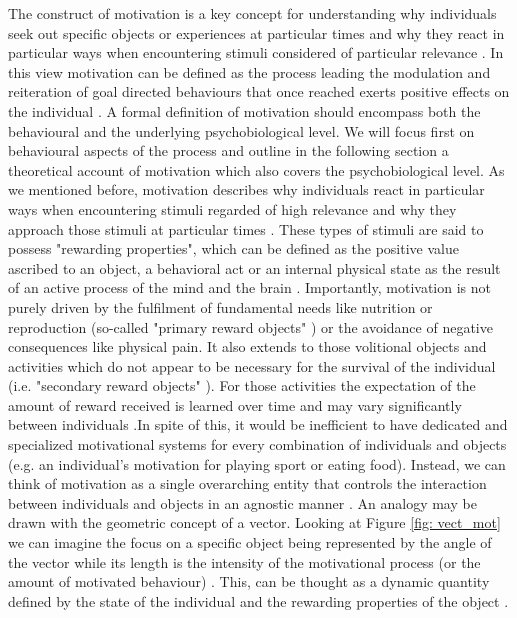 The construct of motivation is a key concept for understanding why individuals seek out specific objects or experiences at particular times and why they react in particular ways when encountering stimuli considered of particular relevance \cite{berridge2004motivation}. In this view motivation can be defined as the process leading the modulation and reiteration of goal directed behaviours that once reached exerts positive effects on the individual \cite{simpson2016behavioral}. A formal definition of motivation should encompass both the behavioural and the underlying psychobiological level. We will focus first on behavioural aspects of the process and outline in the following section a theoretical account of motivation which also covers the psychobiological level. As we mentioned before, motivation describes why individuals react in particular ways when encountering stimuli regarded of high relevance and why they approach those stimuli at particular times \cite{berridge2004motivation}. These types of stimuli are said to possess "rewarding properties", which can be defined as the positive value ascribed to an object, a behavioral act or an internal physical state as the result of an active process of the mind and the brain \cite{schultz1997neural,berridge2008affective}. Importantly, motivation is not purely driven by the fulfilment of fundamental needs like nutrition or reproduction (so-called "primary reward objects" \cite{schultz2000reward}) or the avoidance of negative consequences like physical pain. It also extends to those volitional objects and activities which do not appear to be necessary for the survival of the individual (i.e. "secondary reward objects" \cite{berridge2008affective,sescousse2013processing}). For those activities the expectation of the amount of reward received is learned over time and may vary significantly between individuals \cite{berridge2008affective,simpson2016behavioral}.In spite of this, it would be inefficient to have dedicated and specialized motivational systems for every combination of individuals and objects (e.g. an individual's motivation for playing sport or eating food). Instead, we can think of motivation as a single overarching entity that controls the interaction between individuals and objects in an agnostic manner \cite{simpson2016behavioral}. An analogy may be drawn with the geometric concept of a vector. Looking at Figure \ref{fig: vect_mot} we can imagine the focus on a specific object being represented by the angle of the vector while its length is the intensity of the motivational process (or the amount of motivated behaviour) \cite{simpson2016behavioral}. This, can be thought as a dynamic quantity defined by the state of the individual and the rewarding properties of the object \cite{toates1994comparing,berridge2004motivation,zhang2009neural}.
